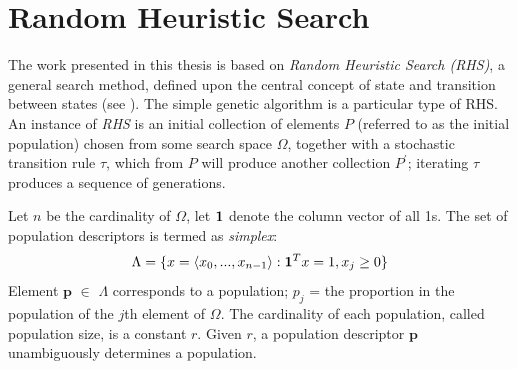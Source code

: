 \section{Random Heuristic Search}
\label{RHS}
The work presented in this thesis is based on {\em Random Heuristic Search (RHS)}, 
a general search method, defined upon the central concept of state and transition 
between states (see \cite{Vose1999}). The simple genetic algorithm is a particular type of RHS. 
An instance of {\em RHS} is an initial collection of elements $P$ (referred to as the initial population) chosen 
from some search space $\Omega$, together with a stochastic transition rule $\tau$, which from $P$ will 
produce another collection $P^\prime$; iterating $\tau$ produces a sequence of generations.

Let $n$ be the cardinality 
of $\Omega$, let ${\bf1}$ denote the column vector of all 1s. 
The set of population descriptors is termed as  {\em simplex}:
\[
\Lambda = \{x = \langle x_0,...,x_{n-1} \rangle: {\bf1}^T x=1, x_j \geq 0 \} %
\]
Element $\bm{p}$ $\in$ $\Lambda$ corresponds to a population;
$p_j$ = the proportion in the population of the $j$th element of $\Omega$. 
The cardinality of each population, called population size, is a constant $r$. 
Given $r$, a population descriptor $\bm{p}$ unambiguously determines a population.

